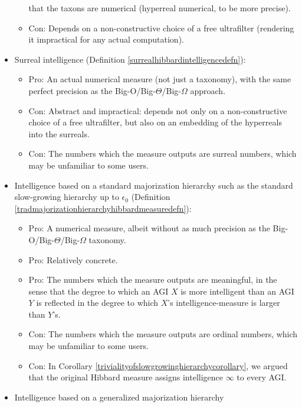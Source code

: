 \documentclass{article}
\begin{document}
\begin{itemize}
\begin{itemize}
        that the taxons are numerical (hyperreal numerical, to be more precise).
        \item
        Con: Depends on a non-constructive choice of a free ultrafilter (rendering it
        impractical for any actual computation).
    \end{itemize}
    \item
    Surreal intelligence (Definition \ref{surrealhibbardintelligencedefn}):
    \begin{itemize}
        \item
        Pro: An actual numerical measure (not just a taxonomy), with the same perfect
        precision as the Big-O/Big-$\Theta$/Big-$\Omega$ approach.
        \item
        Con: Abstract and impractical: depends not only on a
        non-constructive choice of
        a free ultrafilter, but also on an embedding of the hyperreals into the surreals.
        \item
        Con: The numbers which the measure outputs are surreal numbers, which may be
        unfamiliar to some users.
    \end{itemize}
    \item
    Intelligence based on a standard majorization hierarchy such as the
    standard slow-growing hierarchy up to $\epsilon_0$
    (Definition \ref{tradmajorizationhierarchyhibbardmeasuredefn}):
    \begin{itemize}
        \item
        Pro: A numerical measure, albeit without as much precision as the
        Big-O/Big-$\Theta$/Big-$\Omega$ taxonomy.
        \item
        Pro: Relatively concrete.
        \item
        Pro: The numbers which the measure outputs are meaningful, in the sense that
        the degree to which an AGI $X$ is more intelligent than an AGI $Y$ is reflected
        in the degree to which $X$'s intelligence-measure is larger than $Y$'s.
        \item
        Con: The numbers which the measure outputs are ordinal numbers, which may be
        unfamiliar to some users.
        \item
        Con: In Corollary \ref{trivialityofslowgrowinghierarchycorollary}, we argued
        that the original Hibbard measure assigns intelligence $\infty$ to every AGI.
    \end{itemize}
    \item
    Intelligence based on a generalized majorization hierarchy

\end{itemize}
\end{document}
